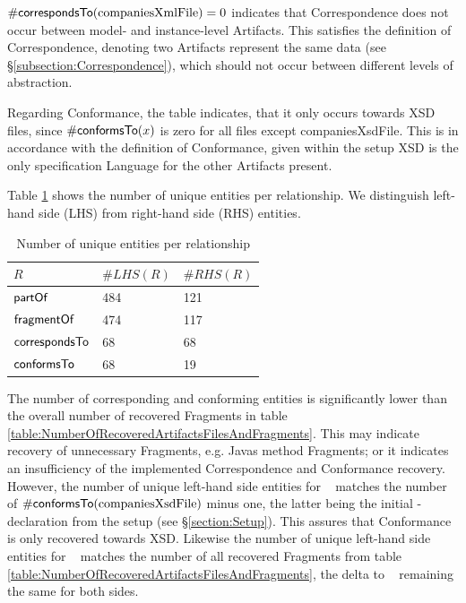 $\#\textsf{correspondsTo}(\text{companiesXmlFile}) = 0$ indicates that \gls{Correspondence} does not occur between model- and instance-level \glspl{Artifact}.
This satisfies the definition of \gls{Correspondence}, denoting two \glspl{Artifact} represent the same data (see §\ref{subsection:Correspondence}), which should not occur between different levels of abstraction.

Regarding \gls{Conformance}, the table indicates, that it only occurs towards \gls{XSD} files, since $\#\textsf{conformsTo}(x)$ is zero for all files except companiesXsdFile.
This is in accordance with the definition of \gls{Conformance}, given within the setup \gls{XSD} is the only specification \gls{Language} for the other \glspl{Artifact} present.

Table \ref{table:NumberOfUniqueEntitiesPerRelationship} shows the number of unique entities per relationship.
We distinguish left-hand side (LHS) from right-hand side (RHS) entities.
\begin{table}[h!]
\begin{center}
\begin{tabular}{|l|l|l|}
\hline
$R$ & $\#LHS(R)$ & $\#RHS(R)$
\\ \hline
$\textsf{partOf}$ & 484 & 121
\\ \hline
$\textsf{fragmentOf}$ & 474 & 117
\\ \hline
$\textsf{correspondsTo}$ & 68 & 68
\\ \hline
$\textsf{conformsTo}$ & 68 & 19
\\ \hline 
\end{tabular}
\end{center}
\caption{Number of unique entities per relationship}
\label{table:NumberOfUniqueEntitiesPerRelationship}
\end{table}
The number of corresponding and conforming entities is significantly lower than the overall number of recovered \glspl{Fragment} in table \ref{table:NumberOfRecoveredArtifactsFilesAndFragments}.
This may indicate recovery of unnecessary \glspl{Fragment}, e.g. \glspl{Java} method \glspl{Fragment}; or it indicates an insufficiency of the implemented \gls{Correspondence} and \gls{Conformance} recovery.
However, the number of unique left-hand side entities for \conformsTo~ matches the number of $\#\textsf{conformsTo}(\text{companiesXsdFile})$ minus one, the latter being the initial \conformsTo-declaration from the setup (see §\ref{section:Setup}).
This assures that \gls{Conformance} is only recovered towards \gls{XSD}.
Likewise the number of unique left-hand side entities for \fragmentOf~ matches the number of all recovered \glspl{Fragment} from table \ref{table:NumberOfRecoveredArtifactsFilesAndFragments}, the delta to \partOf~ remaining the same for both sides.